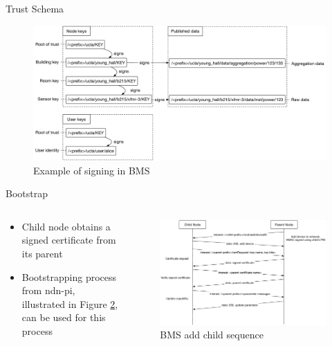 \documentclass[final,hyperref={pdfpagelabels=false},20pt]{beamer}
\begin{document}
\begin{frame}[t]
\begin{columns}[t]
\begin{column}{.465\textwidth}
\begin{block}{Trust Schema}
\begin{figure}
\includegraphics[width=0.95\linewidth]{bms-signing-verification}
\caption{Example of signing in BMS}
\label{fig:bms-signing-example}
\end{figure}

Bootstrap

\begin{columns}[T]

\begin{column}{.35\textwidth}

\begin{itemize}
\item{Child node obtains a signed certificate from its parent}
\item{Bootstrapping process from ndn-pi, illustrated in Figure \ref{fig:add-child-sequence}, can be used for this process}
\end{itemize}
\end{column}

\begin{column}{.65\textwidth}
\begin{figure}
\includegraphics[width=\linewidth]{bms-add-child-sequence}
\caption{BMS add child sequence}
\label{fig:add-child-sequence}
\end{figure}
\end{column}


\end{columns}
\end{block}
\end{column}
\end{columns}
\end{frame}
\end{document}
